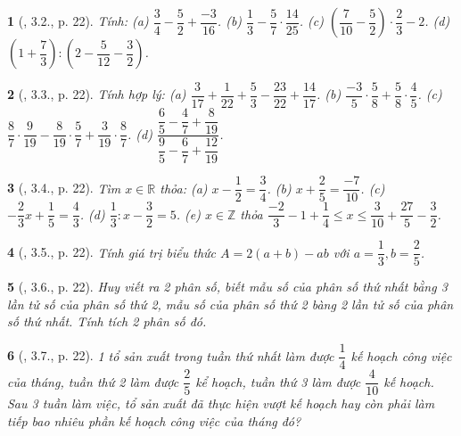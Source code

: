 \documentclass{article}
\newtheorem{baitoan}{}
\begin{document}
\begin{baitoan}[\cite{Binh_boi_duong_Toan_6_tap_2}, 3.2., p. 22]
	Tính: (a) $\dfrac{3}{4} - \dfrac{5}{2} + \dfrac{-3}{16}$. (b) $\dfrac{1}{3} - \dfrac{5}{7}\cdot\dfrac{14}{25}$. (c) $\left(\dfrac{7}{10} - \dfrac{5}{2}\right)\cdot\dfrac{2}{3} - 2$. (d) $\left(1 + \dfrac{7}{3}\right):\left(2 - \dfrac{5}{12} - \dfrac{3}{2}\right)$.
\end{baitoan}

\begin{baitoan}[\cite{Binh_boi_duong_Toan_6_tap_2}, 3.3., p. 22]
	Tính hợp lý: (a) $\dfrac{3}{17} + \dfrac{1}{22} + \dfrac{5}{3} - \dfrac{23}{22} + \dfrac{14}{17}$. (b) $\dfrac{-3}{5}\cdot\dfrac{5}{8} + \dfrac{5}{8}\cdot\dfrac{4}{5}$. (c) $\dfrac{8}{7}\cdot\dfrac{9}{19} - \dfrac{8}{19}\cdot\dfrac{5}{7} + \dfrac{3}{19}\cdot\dfrac{8}{7}$. (d) $\dfrac{\dfrac{6}{5} - \dfrac{4}{7} + \dfrac{8}{19}}{\dfrac{9}{5} - \dfrac{6}{7} + \dfrac{12}{19}}$.
\end{baitoan}

\begin{baitoan}[\cite{Binh_boi_duong_Toan_6_tap_2}, 3.4., p. 22]
	Tìm $x\in\mathbb{R}$ thỏa: (a) $x - \dfrac{1}{2} = \dfrac{3}{4}$. (b) $x + \dfrac{2}{5} = \dfrac{-7}{10}$. (c) $-\dfrac{2}{3}x + \dfrac{1}{5} = \dfrac{4}{3}$. (d) $\dfrac{1}{3}:x - \dfrac{3}{2} = 5$. (e) $x\in\mathbb{Z}$ thỏa $\dfrac{-2}{3} - 1 + \dfrac{1}{4}\le x\le\dfrac{3}{10} + \dfrac{27}{5} - \dfrac{3}{2}$.
\end{baitoan}

\begin{baitoan}[\cite{Binh_boi_duong_Toan_6_tap_2}, 3.5., p. 22]
	Tính giá trị biểu thức $A = 2(a + b) - ab$ với $a = \dfrac{1}{3},b = \dfrac{2}{5}$.
\end{baitoan}

\begin{baitoan}[\cite{Binh_boi_duong_Toan_6_tap_2}, 3.6., p. 22]
	Huy viết ra 2 phân số, biết mẫu số của phân số thứ nhất bằng 3 lần tử số của phân số thứ 2, mẫu số của phân số thứ 2 bàng 2 lần tử số của phân số thứ nhất. Tính tích 2 phân số đó.
\end{baitoan}

\begin{baitoan}[\cite{Binh_boi_duong_Toan_6_tap_2}, 3.7., p. 22]
	1 tổ sản xuất trong tuần thứ nhất làm được $\dfrac{1}{4}$ kế hoạch công việc của tháng, tuần thứ 2 làm được $\dfrac{2}{5}$ kể hoạch, tuần thứ 3 làm được $\dfrac{4}{10}$ kế hoạch. Sau 3 tuần làm việc, tổ sản xuất đã thực hiện vượt kế hoạch hay còn phải làm tiếp bao nhiêu phần kế hoạch công việc của tháng đó?
\end{baitoan}
\end{document}
